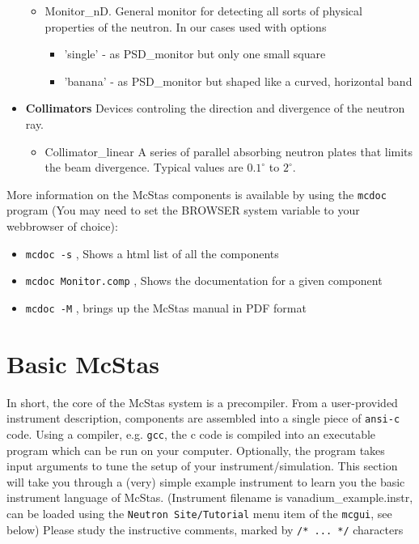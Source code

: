 \documentclass[a4paper]{article}
\begin{document}
\begin{itemize}
\begin{itemize}
    \item{Monitor\_nD. General monitor for detecting all sorts of
        physical properties of the neutron. In our cases used with
        options }
      \begin{itemize}
      \item{'single' - as PSD\_monitor but only one small square}
      \item{'banana' - as PSD\_monitor but shaped like a curved,
          horizontal band }
      \end{itemize}
    \end{itemize}
  \item{{\bf Collimators}} Devices controling the direction and divergence
   of the neutron ray.
    \begin{itemize}
      \item{Collimator\_linear} A series of parallel absorbing neutron plates
       that limits the beam divergence. 
       Typical values are $0.1^\circ$ to $2^\circ$.
    \end{itemize}
  \end{itemize}
More information on the McStas components is available by using the
\verb+mcdoc+ program (You may need to set the BROWSER system variable
to your webbrowser of choice):
\begin{itemize}
\item{\verb+mcdoc -s+ , Shows a html list of all the components}
\item{\verb+mcdoc Monitor.comp+ , Shows the documentation for a given component}
\item{\verb+mcdoc -M+ , brings up the McStas manual in PDF format}
\end{itemize}

\section{Basic McStas}
In short, the core of the McStas system is a precompiler. From a
user-provided instrument description, components are assembled into 
a single piece of \texttt{ansi-c} code. Using a compiler, e.g. 
\texttt{gcc}, the c code is compiled into an executable program 
which can be run on your computer. Optionally, the program takes 
input arguments to tune the setup of your instrument/simulation. 
This section will take you through a (very) simple example instrument 
to learn you the basic instrument language of McStas. (Instrument 
filename is vanadium\_example.instr, can be loaded using the
\verb+Neutron Site/Tutorial+ menu item of the \verb+mcgui+, see below)
Please study the instructive comments,
marked by \verb+/* ... */+ characters
    
\end{document}
